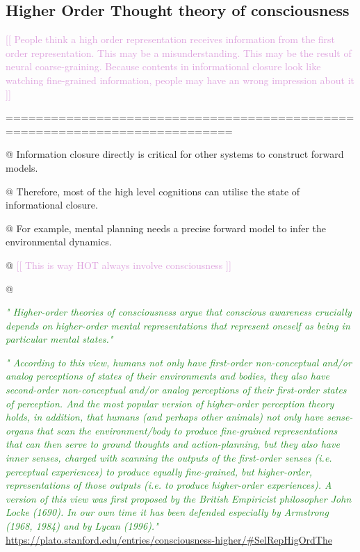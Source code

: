 \documentclass[utf8]{article}
\newenvironment{ants}
			{
			 \begin{easylist}[itemize]
			}
			{
			\end{easylist}
			}
\newcommand{\rewrite}[1]{\textcolor{ForestGreen}{\textit{"#1"}}\newline}
\newcommand{\idea}[1]{\noindent
				\textcolor{Plum}{[[ #1 ]]}}
\begin{document}
		
		

				
			
		\subsection{Higher Order Thought theory of consciousness}	
			\idea{
				People think a high order representation receives information from the first order representation. This may be a misunderstanding. This may be the result of neural coarse-graining. Because contents in informational closure look like watching fine-grained information, people may have an wrong impression about it}
		
			============================================================================			
			\begin{ants}
				@ Information closure directly is critical for other systems to construct forward models. 
				
				@ Therefore, most of the high level cognitions can utilise the state of informational closure.
				
				@ For example, mental planning needs a precise forward model to infer the environmental dynamics. 
				
				@ \idea{This is way HOT always involve consciousness }
				
				@ \cite{rosenthal2005consciousness}
			\end{ants}
		
		
			\rewrite{
				Higher-order theories of consciousness argue that conscious awareness crucially depends on higher-order mental representations that represent oneself as being in particular mental states.} \cite{lau2011empirical}
		
		
			\rewrite{
				According to this view, humans not only have first-order non-conceptual and/or analog perceptions of states of their environments and bodies, they also have second-order non-conceptual and/or analog perceptions of their first-order states of perception. And the most popular version of higher-order perception theory holds, in addition, that humans (and perhaps other animals) not only have sense-organs that scan the environment/body to produce fine-grained representations that can then serve to ground thoughts and action-planning, but they also have inner senses, charged with scanning the outputs of the first-order senses (i.e. perceptual experiences) to produce equally fine-grained, but higher-order, representations of those outputs (i.e. to produce higher-order experiences). A version of this view was first proposed by the British Empiricist philosopher John Locke (1690). In our own time it has been defended especially by Armstrong (1968, 1984) and by Lycan (1996).} \url{https://plato.stanford.edu/entries/consciousness-higher/#SelRepHigOrdThe}
			
\end{document}
